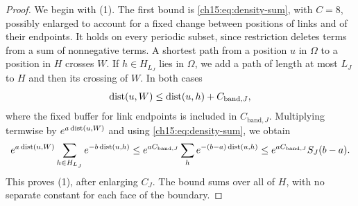 \begin{proof}
We begin with (1). The first bound is \eqref{ch15:eq:density-sum}, with $C=8$, possibly enlarged to account for a fixed change between positions of links and of their endpoints. It holds on every periodic subset, since restriction deletes terms from a sum of nonnegative terms. A shortest path from a position $u$ in $\Omega$ to a position in $H$ crosses $W$. If $h\in H_{L_J}$ lies in $\Omega$, we add a path of length at most $L_J$ to $H$ and then its crossing of $W$. In both cases
\begin{equation}\label{ch15:eq:live-hole-distance}
 \operatorname{dist}(u,W)\le\operatorname{dist}(u,h)+C_{\mathrm{band},J},
\end{equation}
where the fixed buffer for link endpoints is included in $C_{\mathrm{band},J}$. Multiplying termwise by $e^{a\operatorname{dist}(u,W)}$ and using \eqref{ch15:eq:density-sum}, we obtain
\[
 e^{a\operatorname{dist}(u,W)}\sum_{h\in H_{L_J}}e^{-b\operatorname{dist}(u,h)}
 \le e^{aC_{\mathrm{band},J}}
       \sum_h e^{-(b-a)\operatorname{dist}(u,h)}
 \le e^{aC_{\mathrm{band},J}}S_J(b-a).
\]
This proves (1), after enlarging $C_J$. The bound sums over all of $H$, with no separate constant for each face of the boundary.


\end{proof}
